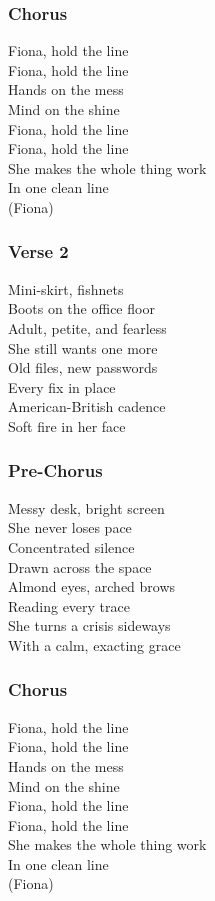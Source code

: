 \documentclass[]{article}
\begin{document}
\subsubsection{Chorus}\label{chorus-28}

Fiona, hold the line\\
Fiona, hold the line\\
Hands on the mess\\
Mind on the shine\\
Fiona, hold the line\\
Fiona, hold the line\\
She makes the whole thing work\\
In one clean line\\
(Fiona)

\subsubsection{Verse 2}\label{verse-2-8}

Mini-skirt, fishnets\\
Boots on the office floor\\
Adult, petite, and fearless\\
She still wants one more\\
Old files, new passwords\\
Every fix in place\\
American-British cadence\\
Soft fire in her face

\subsubsection{Pre-Chorus}\label{pre-chorus-17}

Messy desk, bright screen\\
She never loses pace\\
Concentrated silence\\
Drawn across the space\\
Almond eyes, arched brows\\
Reading every trace\\
She turns a crisis sideways\\
With a calm, exacting grace

\subsubsection{Chorus}\label{chorus-29}

Fiona, hold the line\\
Fiona, hold the line\\
Hands on the mess\\
Mind on the shine\\
Fiona, hold the line\\
Fiona, hold the line\\
She makes the whole thing work\\
In one clean line\\
(Fiona)
\end{document}
